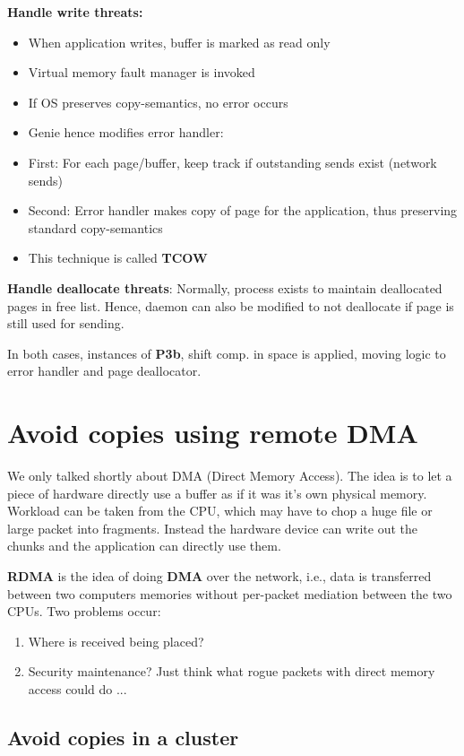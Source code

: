 \textbf{Handle write threats:} \begin{itemize}
    \item When application writes, buffer is marked as read only
    \item Virtual memory fault manager is invoked
    \item If OS preserves copy-semantics, no error occurs
    \item Genie hence modifies error handler:
    \item First: For each page/buffer, keep track if outstanding sends exist (network sends)
    \item Second: Error handler makes copy of page for the application, thus preserving standard copy-semantics
    \item This technique is called \textbf{TCOW}
\end{itemize}

\textbf{Handle deallocate threats}: Normally, process exists to maintain deallocated pages in free list. Hence, daemon can also be modified to not deallocate if page is still used for sending.

In both cases, instances of \textbf{P3b}, shift comp. in space is applied, moving logic to error handler and page deallocator.

\section{Avoid copies using remote DMA}

We only talked shortly about DMA (Direct Memory Access). The idea is to let a piece of hardware directly use a buffer as if it was it's own physical memory. Workload can be taken from the CPU, which may have to chop a huge file or large packet into fragments. Instead the hardware device can write out the chunks and the application can directly use them.

\textbf{RDMA} is the idea of doing \textbf{DMA} over the network, i.e., data is transferred between two computers memories without per-packet mediation between the two CPUs. Two problems occur:

\begin{enumerate}
\item Where is received being placed?
\item Security maintenance? Just think what rogue packets with direct memory access could do ...
\end{enumerate}

\subsection{Avoid copies in a cluster}

